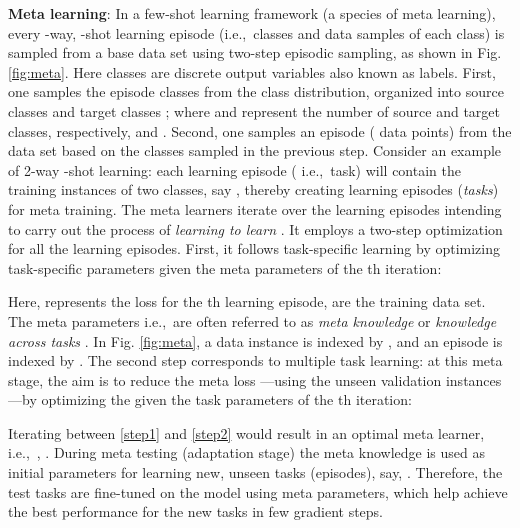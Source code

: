 \documentclass[conference]{IEEEtran}
\newcommand*{\ie}		{i.e.,\ }
\begin{document}
 \textbf{Meta learning}:
In a few-shot learning framework (a species of meta learning), every -way, -shot learning episode (\ie  classes and  data samples of each class) is sampled from a base data set using two-step episodic sampling, as shown in Fig. \ref{fig:meta}.
Here classes are discrete output variables also known as labels.
First, one samples the episode classes from the class distribution, organized into source classes  and target classes ; where  and  represent the number of source and target classes, respectively, and .
Second, one samples an episode ( data points) from the data set based on the classes sampled in the previous step. 
Consider an example of 2-way -shot learning: each learning episode ( \ie task) will contain the training instances of two classes, say , thereby creating  learning episodes (\emph{tasks}) for meta training.
The meta learners iterate over the learning episodes intending to carry out the process of \emph{learning to learn} \cite{hospedales2020meta}. 
It employs a two-step optimization \cite{pmlr-v70-finn17a} for all the learning episodes. 
First, it follows task-specific learning by optimizing task-specific parameters  given the meta parameters  of the th iteration:

Here,  represents the loss for the th learning episode,  are the training data set. The meta parameters \ie  are often referred to as \emph{meta knowledge} or \emph{knowledge across tasks} \cite{hospedales2020meta}.
In Fig. \ref{fig:meta}, a data instance is indexed by , and an episode is indexed by . 
The second step corresponds to multiple task learning: at this meta stage, the aim is to reduce the meta loss ---using the unseen validation instances ---by optimizing the  given the task parameters of the th iteration:

Iterating between \eqref{step1} and \eqref{step2} would result in an optimal meta learner, \ie, .
During meta testing (adaptation  stage) the meta knowledge  is used as initial parameters for learning new, unseen tasks (episodes), say, . 
Therefore, the test tasks are fine-tuned on the model using meta parameters, which help achieve the best performance for the new tasks in few gradient steps.  
\end{document}
